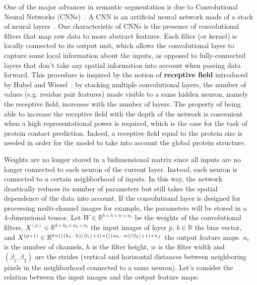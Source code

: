         One of the major advances in semantic segmentation
        is due to Convolutional Neural Networks (CNNs)~\cite{DBLP:journals/corr/Garcia-GarciaOO17}.
        A CNN is an artificial neural network made of a stack of neural layers~\cite{lecun1998gradient}. One characteristic of CNNs is the
        presence of convolutional filters that map raw data to more abstract features.
        Each filter (or kernel) is locally connected to its output unit, which
        allows the convolutional layer to capture some local information about the inputs,
        as opposed to fully-connected layers that don't take any spatial
        information into account when passing data forward. This procedure is inspired by the notion of \textbf{receptive field} introduced
        by Hubel and Wiesel~\cite{Hubel1962}: by stacking multiple convolutional layers, the number of values
        (e.g. residue pair features) made visible to a same hidden neuron, namely the receptive field, increases with the number of layers.
        The property of being able to increase the receptive field with the depth of the network is convenient
        when a high representational power is required, which is the case for the task of protein
        contact prediction. Indeed, a receptive field equal to the protein size is needed in order for the model to take into account
        the global protein structure.

        Weights are no longer stored in a bidimensional matrix since all inputs are no longer connected to each neuron of the current layer.
        Instead, each neuron is connected to a certain neighborhood of inputs. In this way, the network drastically reduces its number of parameters
        but still takes the spatial dependence of the data into account.
        If the convolutional layer is designed for processing multi-channel images for example,
        the parameters will be stored in a 4-dimensional tensor.
        Let $W \in \mathbb{R}^{b \times h \times w \times n_c}$ be the weights of the convolutional filters,
        $X^{(p)} \in \mathbb{R}^{b \times h_b \times w_b \times n_c}$ the input images of layer $p$, $b \in \mathbb{R}$ the bias vector,
        and $X^{(p+1)} \in \mathbb{R}^{b \times (\lfloor(h_b - h) / \beta_1\rfloor + 1) \times (\lfloor(w_b - w) / \beta_2\rfloor + 1) \times n_f}$
        the output feature maps.
        $n_c$ is the number of channels, $h$ is the filter height, $w$ is the filter width
        and $(\beta_1, \beta_2)$ are the strides
        (vertical and horizontal distances between neighboring pixels in the neighborhood connected to a same neuron).
        Let's consider the relation between the input images and the output feature maps:

